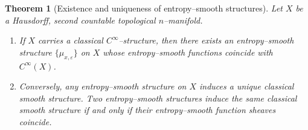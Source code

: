 \documentclass[11pt]{amsart}
\newtheorem{theorem}{Theorem}[section]
\theoremstyle{definition}
\theoremstyle{remark}
\begin{document}
\begin{theorem}[Existence and uniqueness of entropy--smooth structures]
\label{thm:existence-uniqueness}
Let $X$ be a Hausdorff, second countable topological $n$--manifold.

\begin{enumerate}
\item[(a)] If $X$ carries a classical $C^\infty$--structure, then there exists
an entropy--smooth structure $\{\mu_{x,\varepsilon}\}$ on $X$ whose
entropy--smooth functions coincide with $C^\infty(X)$.

\item[(b)] Conversely, any entropy--smooth structure on $X$ induces a
unique classical smooth structure.  Two entropy--smooth structures induce
the same classical smooth structure if and only if their entropy--smooth
function sheaves coincide.
\end{enumerate}
\end{theorem}
\end{document}
